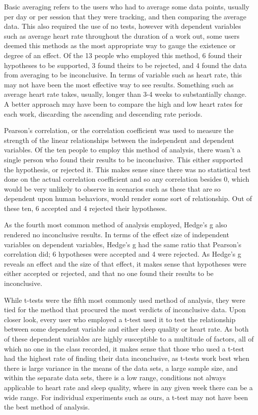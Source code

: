 Basic averaging refers to the users who had to average some data points, usually per day or per session that they were tracking, and then comparing the average data.  This also required the use of no tests, however with dependent variables such as average heart rate throughout the duration of a work out, some users deemed this methods as the most appropriate way to gauge the existence or degree of an effect.  Of the 13 people who employed this method, 6 found their hypotheses to be supported, 3 found theirs to be rejected, and 4 found the data from averaging to be inconclusive.  In terms of variable such as heart rate, this may not have been the most effective way to see results.  Something such as average heart rate takes, usually, longer than 3-4 weeks to substantially change.  A better approach may have been to compare the high and low heart rates for each work, discarding the ascending and descending rate periods.  

Pearson’s correlation, or the correlation coefficient was used to measure the strength of the linear relationships between the independent and dependent variables.  Of the ten people to employ this method of analysis, there wasn’t a single person who found their results to be inconclusive.  This either supported the hypothesis, or rejected it.  This makes sense since there was no statistical test done on the actual correlation coefficient and so any correlation besides 0, which would be very unlikely to observe in scenarios such as these that are so dependent upon human behaviors, would render some sort of relationship. Out of these ten, 6 accepted and 4 rejected their hypotheses. 

As the fourth most common method of analysis employed, Hedge’s g also rendered no inconclusive results.  In terms of the effect size of independent variables on dependent variables, Hedge’s g had the same ratio that Pearson’s correlation did; 6 hypotheses were accepted and 4 were rejected.  As Hedge’s g reveals an effect and the size of that effect, it makes sense that hypotheses were either accepted or rejected, and that no one found their results to be inconclusive. 

While t-tests were the fifth most commonly used method of analysis, they were tied for the method that procured the most verdicts of inconclusive data.  Upon closer look, every user who employed a t-test used it to test the relationship between some dependent variable and either sleep quality or heart rate.  As both of these dependent variables are highly susceptible to a multitude of factors, all of which no one in the class recorded, it makes sense that those who used a t-test had the highest rate of finding their data inconclusive, as t-tests work best when there is large variance in the means of the data sets, a large sample size, and within the separate data sets, there is a low range, conditions not always applicable to heart rate and sleep quality, where in any given week there can be a wide range.  For individual experiments such as ours, a t-test may not have been the best method of analysis.

